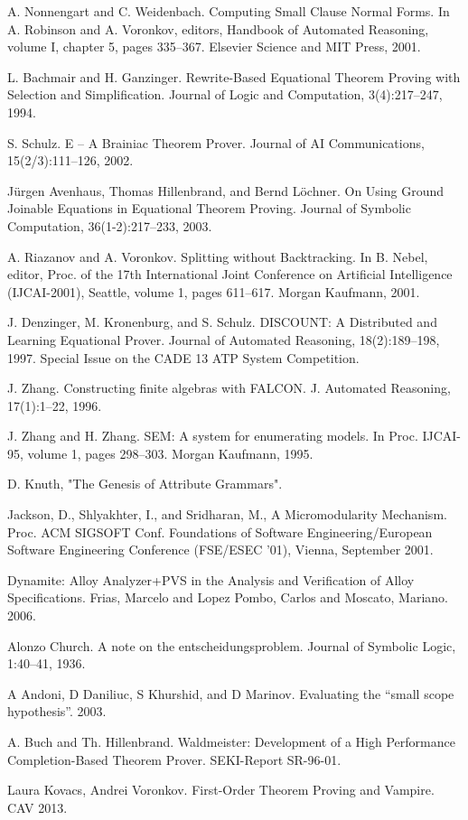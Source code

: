\begin{thebibliography}{tesis}
	A. Nonnengart and C. Weidenbach. Computing Small Clause Normal Forms. In A. Robinson and A. Voronkov, editors, Handbook of Automated Reasoning, volume I, chapter 5, pages 335–367. Elsevier Science and MIT Press, 2001.

	L. Bachmair and H. Ganzinger. Rewrite-Based Equational Theorem Proving with Selection and Simplification. Journal of Logic and Computation, 3(4):217–247, 1994.

S. Schulz. E – A Brainiac Theorem Prover. Journal of AI Communications, 15(2/3):111–126, 2002.

Jürgen Avenhaus, Thomas Hillenbrand, and Bernd Löchner. On Using Ground Joinable Equations in Equational Theorem Proving. Journal of Symbolic Computation, 36(1-2):217–233, 2003.

A. Riazanov and A. Voronkov. Splitting without Backtracking. In B. Nebel, editor, Proc. of the 17th International Joint Conference on Artificial Intelligence (IJCAI-2001), Seattle, volume 1, pages 611–617. Morgan Kaufmann, 2001.

J. Denzinger, M. Kronenburg, and S. Schulz. DISCOUNT: A Distributed and Learning Equational Prover. Journal of Automated Reasoning, 18(2):189–198, 1997. Special Issue on the CADE 13 ATP System Competition.

 J. Zhang. Constructing finite algebras with FALCON. J. Automated Reasoning, 17(1):1–22,
1996.

 J. Zhang and H. Zhang. SEM: A system for enumerating models. In Proc. IJCAI-95,
volume 1, pages 298–303. Morgan Kaufmann, 1995.

 D. Knuth, "The Genesis of Attribute Grammars".

  Jackson, D., Shlyakhter, I., and Sridharan, M., A Micromodularity Mechanism.
Proc. ACM SIGSOFT Conf. Foundations of Software Engineering/European Software
Engineering Conference (FSE/ESEC ’01), Vienna, September 2001.

 Dynamite: Alloy Analyzer+PVS in the Analysis and Verification of Alloy Specifications. Frias, Marcelo and Lopez Pombo, Carlos and Moscato, Mariano. 2006.

 Alonzo Church. A note on the entscheidungsproblem. Journal of Symbolic Logic, 1:40–41, 1936.

 A Andoni, D Daniliuc, S Khurshid, and D Marinov. Evaluating the
“small scope hypothesis”. 2003.

 A. Buch and Th. Hillenbrand. Waldmeister: Development of a High Performance Completion-Based Theorem Prover. SEKI-Report SR-96-01.

 Laura Kovacs, Andrei Voronkov. First-Order Theorem Proving and Vampire. CAV 2013.

\end{thebibliography}

